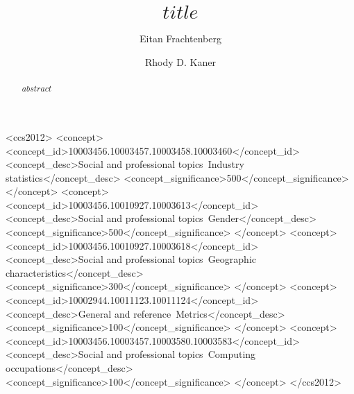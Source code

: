 \documentclass[sigconf]{acmart}
\begin{document}
\title{$title$}

\author{Eitan Frachtenberg}

\author{Rhody D. Kaner}

\renewcommand{\shortauthors}{Frachtenberg and Kaner}

\begin{abstract}
  $abstract$
\end{abstract}


\begin{CCSXML}
<ccs2012>
<concept>
<concept_id>10003456.10003457.10003458.10003460</concept_id>
<concept_desc>Social and professional topics~Industry statistics</concept_desc>
<concept_significance>500</concept_significance>
</concept>
<concept>
<concept_id>10003456.10010927.10003613</concept_id>
<concept_desc>Social and professional topics~Gender</concept_desc>
<concept_significance>500</concept_significance>
</concept>
<concept>
<concept_id>10003456.10010927.10003618</concept_id>
<concept_desc>Social and professional topics~Geographic characteristics</concept_desc>
<concept_significance>300</concept_significance>
</concept>
<concept>
<concept_id>10002944.10011123.10011124</concept_id>
<concept_desc>General and reference~Metrics</concept_desc>
<concept_significance>100</concept_significance>
</concept>
<concept>
<concept_id>10003456.10003457.10003580.10003583</concept_id>
<concept_desc>Social and professional topics~Computing occupations</concept_desc>
<concept_significance>100</concept_significance>
</concept>
</ccs2012>
\end{CCSXML}



\end{document}
